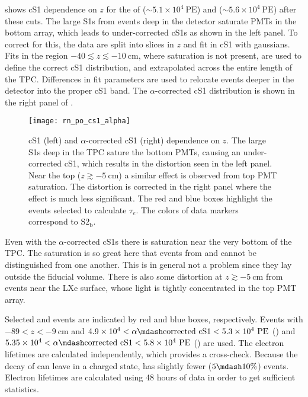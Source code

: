  shows cS1 dependence on $z$ for the \alphadecays of 
(${\sim} 5.1 \times 10^4 \ \mathrm{PE}$) and  (${\sim} 5.6 \times 10^4\ \mathrm{PE}$) after these cuts.  The large
S1s from events deep in the detector saturate PMTs in the bottom array, which leads to under-corrected cS1s as shown in the left
panel.  To correct for this, the data are split into slices in $z$ and fit in cS1 with gaussians.  Fits in the region
$-40 \lesssim z \lesssim -10\ \mathrm{cm}$, where saturation is not present, are used to define the correct cS1 distribution, and
extrapolated across the entire length of
the TPC.  Differences in fit parameters are used to relocate events deeper in the detector into the proper cS1 band.  The
$\alpha$-corrected cS1 distribution is shown in the right panel of .

\begin{figure}
\centering
\texttt{[image: rn\_po\_cs1\_alpha]}
\caption[cS1 and $\alpha$-corrected cS1 dependence on $z$ for  and  $\alpha$-decays.]{cS1 (left) and
$\alpha$-corrected cS1 (right) dependence on $z$.  The large \alphadecay S1s deep in
the TPC sature the bottom PMTs, causing an under-corrected cS1, which
results in the distortion seen in the left panel.  Near the top ($z \gtrsim -5\ \mathrm{cm}$) a similar effect is observed from top PMT
saturation.  The distortion is corrected in the right panel where the effect is much less significant.  The red and blue boxes highlight
the events selected to calculate $\tau_e$.  The colors of data markers correspond to $\mathrm{S2_b}$.}
\label{fig:electron_lifetimes_measurement_alphas_s1}
\end{figure}

Even with the $\alpha$-corrected cS1s there is saturation near the very bottom of the TPC.  The saturation is so great
here that events from  and  cannot be distinguished from one another.  This is in general not a problem since they
lay outside the fiducial volume.  There is also some distortion at $z \gtrsim -5\ \mathrm{cm}$ from events
near the LXe surface, whose light is tightly concentrated in the top PMT array.

Selected  and  events are indicated by red and blue boxes, respectively.  Events with $-89< z < -9\ \mathrm{cm}$
and $4.9 \times 10^4 < \alpha \mdash \mathrm{corrected\ cS1} < 5.3 \times 10^4\ \mathrm{PE}$ () and
$5.35 \times 10^4 < \alpha \mdash \mathrm{corrected\ cS1} < 5.8 \times 10^4\ \mathrm{PE}$ () are used.  The electron
lifetimes are calculated independently, which provides a cross-check.  Because the decay of  can leave 
in a charged state,  has slightly fewer ($5 \mdash 10\%$) events.  Electron lifetimes are calculated using 48 hours of data in
order to get sufficient statistics.


